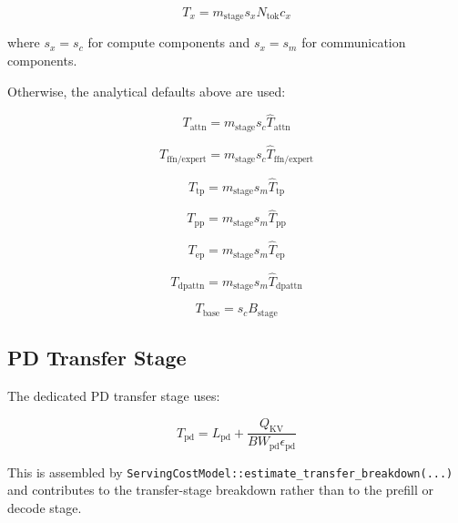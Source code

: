 \begin{equation*}
T_x =
m_{\mathrm{stage}} s_x N_{\mathrm{tok}} c_x
\end{equation*}

where \(s_x = s_c\) for compute components and \(s_x = s_m\) for communication
components.

Otherwise, the analytical defaults above are used:

\begin{equation*}
T_{\mathrm{attn}} = m_{\mathrm{stage}} s_c \widehat{T}_{\mathrm{attn}}
\end{equation*}

\begin{equation*}
T_{\mathrm{ffn/expert}} =
m_{\mathrm{stage}} s_c \widehat{T}_{\mathrm{ffn/expert}}
\end{equation*}

\begin{equation*}
T_{\mathrm{tp}} = m_{\mathrm{stage}} s_m \widehat{T}_{\mathrm{tp}}
\end{equation*}

\begin{equation*}
T_{\mathrm{pp}} = m_{\mathrm{stage}} s_m \widehat{T}_{\mathrm{pp}}
\end{equation*}

\begin{equation*}
T_{\mathrm{ep}} = m_{\mathrm{stage}} s_m \widehat{T}_{\mathrm{ep}}
\end{equation*}

\begin{equation*}
T_{\mathrm{dpattn}} = m_{\mathrm{stage}} s_m \widehat{T}_{\mathrm{dpattn}}
\end{equation*}

\begin{equation*}
T_{\mathrm{base}} = s_c B_{\mathrm{stage}}
\end{equation*}

\subsection{PD Transfer Stage}

The dedicated PD transfer stage uses:

\begin{equation*}
T_{\mathrm{pd}} =
L_{\mathrm{pd}} +
\frac{Q_{\mathrm{KV}}}{BW_{\mathrm{pd}} \epsilon_{\mathrm{pd}}}
\end{equation*}

This is assembled by
\texttt{ServingCostModel::estimate\_transfer\_breakdown(...)} and contributes to
the transfer-stage breakdown rather than to the prefill or decode stage.
